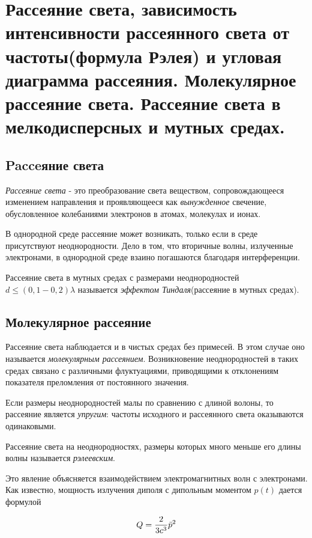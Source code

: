
\section{Рассеяние света, зависимость интенсивности рассеянного света от частоты(формула Рэлея) и угловая диаграмма рассеяния. Молекулярное рассеяние света. Рассеяние света в мелкодисперсных и мутных средах. }


\subsection{Pacceяние света}

\textit{Рассеяние света} - это преобразование света веществом, сопровождающееся изменением направления и проявляющееся как \textit{вынужденное} свечение, обусловленное колебаниями электронов в атомах, молекулах и ионах.

В однородной среде рассеяние может возникать, только если в среде присутствуют неоднородности. Дело в том, что вторичные волны, излученные электронами, в однородной среде взаино погашаются благодаря интерференции.

Рассеяние света в мутных средах с размерами неоднородностей $d\leq(0,1-0,2)\lambda$ называется \textit{эффектом Тиндаля}(рассеяние в мутных средах).



\subsection{Молекулярное рассеяние}

Рассеяние света наблюдается и в чистых средах без примесей. В этом случае оно называется \textit{молекулярным рассеянием}. Возникновение неоднородностей в таких средах связано с различными флуктуациями, приводящими к отклонениям показателя преломления от постоянного значения.

Если размеры неоднородностей малы по сравнению с длиной волоны, то рассеяние является \textit{упругим}: частоты исходного и рассеянного света оказываются одинаковыми.

Рассеяние света на неоднородностях, размеры которых много меньше его длины волны называется \textit{рэлеевским}.

Это явление объясняется взаимодействием электромагнитных волн с электронами. Как известно, мощность излучения диполя с дипольным моментом $p(t)$ дается формулой

\begin{equation*}
    Q = \frac{2}{3c^3}\Ddot{p}^2
\end{equation*}

